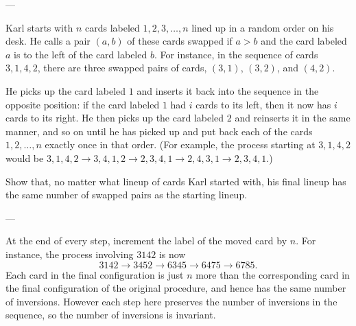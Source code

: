 
---

Karl starts with $n$ cards labeled $1,2,3,\ldots,n$ lined up in a random order on his desk. He calls a pair $(a,b)$ of these cards swapped if $a>b$ and the card labeled $a$ is to the left of the card labeled $b$. For instance, in the sequence of cards $3,1,4,2$, there are three swapped pairs of cards, $(3,1)$, $(3,2)$, and $(4,2)$.

He picks up the card labeled $1$ and inserts it back into the sequence in the opposite position: if the card labeled $1$ had $i$ cards to its left, then it now has $i$ cards to its right. He then picks up the card labeled $2$ and reinserts it in the same manner, and so on until he has picked up and put back each of the cards $1,2,\ldots,n$ exactly once in that order. (For example, the process starting at $3,1,4,2$ would be $3,1,4,2\to3,4,1,2\to2,3,4,1\to2,4,3,1\to2,3,4,1$.)

Show that, no matter what lineup of cards Karl started with, his final lineup has the same number of swapped pairs as the starting lineup.

---

At the end of every step, increment the label of the moved card by $n$. For instance, the process involving $3142$ is now \[3142\to3452\to6345\to6475\to6785.\]
Each card in the final configuration is just $n$ more than the corresponding card in the final configuration of the original procedure, and hence has the same number of inversions. However each step here preserves the number of inversions in the sequence, so the number of inversions is invariant.
